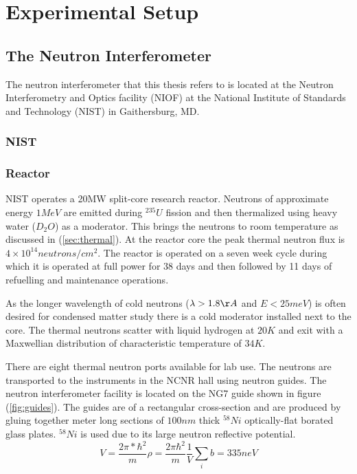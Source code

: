 
\chapter{Experimental Setup} %
\label{Chapter4}


\section{The Neutron Interferometer}
The neutron interferometer that this thesis refers to is located at the Neutron Interferometry and Optics facility (NIOF) at the National Institute of Standards and Technology (NIST) in Gaithersburg, MD. 
\subsection{NIST}
\subsection{Reactor}
NIST operates a 20MW split-core research reactor. Neutrons of approximate energy $1 MeV$ are emitted during $^{235}U$ fission and then thermalized using heavy water ($D_2O$) as a moderator. This brings the neutrons to room temperature as discussed in (\ref{sec:thermal}). At the reactor core the peak thermal neutron flux is $4\times 10^{14} neutrons/cm^2$. The reactor is operated on a seven week cycle during which it is operated at full power for 38 days and then followed by 11 days of refuelling and maintenance operations. 

As the longer wavelength of cold neutrons ($\lambda>1.8\AA$ and $E<25meV$) is often desired for condensed matter study there is a cold moderator installed next to the core. The thermal neutrons scatter with liquid hydrogen at $20K$ and exit with a Maxwellian distribution of characteristic temperature of $34K$. 

There are eight thermal neutron ports available for lab use. The neutrons are transported to the instruments in the NCNR hall using neutron guides. The neutron interferometer facility is located on the NG7 guide shown in figure (\ref{fig:guides}). The guides are of a rectangular cross-section and are produced by gluing together meter long sections of $100nm$ thick $^{58}Ni$ optically-flat borated glass plates. $^{58}Ni$ is used due to its large neutron reflective potential. 
$$V = \frac{2\pi*\hbar^2}{m}\rho=\frac{2\pi\hbar^2}{m}\frac{1}{V}\sum\limits_{i} b = 335neV$$



